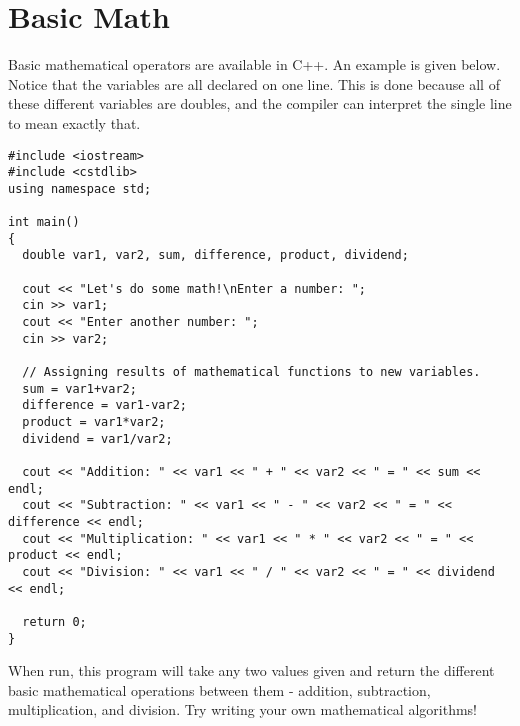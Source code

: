 \section{Basic Math}
Basic mathematical operators are available in C++.  An example is given below.  Notice that the variables are all declared on one line.  This is done because all of these different variables are doubles, and the compiler can interpret the single line to mean exactly that.

\begin{verbatim}
#include <iostream>
#include <cstdlib>
using namespace std;

int main()
{
  double var1, var2, sum, difference, product, dividend;

  cout << "Let's do some math!\nEnter a number: ";
  cin >> var1;
  cout << "Enter another number: ";
  cin >> var2;

  // Assigning results of mathematical functions to new variables.
  sum = var1+var2;
  difference = var1-var2;
  product = var1*var2;
  dividend = var1/var2;

  cout << "Addition: " << var1 << " + " << var2 << " = " << sum << endl;
  cout << "Subtraction: " << var1 << " - " << var2 << " = " << difference << endl;
  cout << "Multiplication: " << var1 << " * " << var2 << " = " << product << endl;
  cout << "Division: " << var1 << " / " << var2 << " = " << dividend << endl;

  return 0;
}
\end{verbatim}

When run, this program will take any two values given and return the different basic mathematical operations between them - addition, subtraction, multiplication, and division.  Try writing your own mathematical algorithms!
